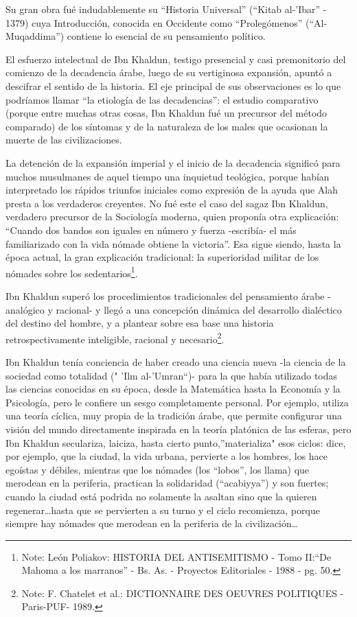 \documentclass[
]{book}
\begin{document}
Su gran obra fué indudablemente su ``Historia Universal'' (``Kitab al-'Ibar'' - 1379) cuya Introducción, conocida en Occidente como ``Prolegómenos'' (``Al-Muqaddima'') contiene lo esencial de su pensamiento político.

El esfuerzo intelectual de Ibn Khaldun, testigo presencial y casi premonitorio del comienzo de la decadencia árabe, luego de su vertiginosa expansión, apuntó a descifrar el sentido de la historia. El eje principal de sus observaciones es lo que podríamos llamar ``la etiología de las decadencias'': el estudio comparativo (porque entre muchas otras cosas, Ibn Khaldun fué un precursor del método comparado) de los síntomas y de la naturaleza de los males que ocasionan la muerte de las civilizaciones.

La detención de la expansión imperial y el inicio de la decadencia significó para muchos musulmanes de aquel tiempo una inquietud teológica, porque habían interpretado los rápidos triunfos iniciales como expresión de la ayuda que Alah presta a los verdaderos creyentes. No fué este el caso del sagaz Ibn Khaldun, verdadero precursor de la Sociología moderna, quien proponía otra explicación: ``Cuando dos bandos son iguales en número y fuerza -escribía- el más familiarizado con la vida nómade obtiene la victoria''. Esa sigue siendo, hasta la época actual, la gran explicación tradicional: la superioridad militar de los nómades sobre los sedentarios\footnote{Note: León Poliakov: HISTORIA DEL ANTISEMITISMO - Tomo II:``De Mahoma a los marranos'' - Bs. As. - Proyectos Editoriales - 1988 - pg. 50.}.

Ibn Khaldun superó los procedimientos tradicionales del pensamiento árabe -analógico y racional- y llegó a una concepción dinámica del desarrollo dialéctico del destino del hombre, y a plantear sobre esa base una historia retrospectivamente inteligible, racional y necesario\footnote{Note: F. Chatelet et al.: DICTIONNAIRE DES OEUVRES POLITIQUES - Paris-PUF- 1989.}.

Ibn Khaldun tenía conciencia de haber creado una ciencia nueva -la ciencia de la sociedad como totalidad (" 'Ilm al-'Umran``)- para la que había utilizado todas las ciencias conocidas en su época, desde la Matemática hasta la Economía y la Psicología, pero le confiere un sesgo completamente personal. Por ejemplo, utiliza una teoría cíclica, muy propia de la tradición árabe, que permite configurar una visión del mundo directamente inspirada en la teoría platónica de las esferas, pero Ibn Khaldun seculariza, laiciza, hasta cierto punto,''materializa" esos ciclos: dice, por ejemplo, que la ciudad, la vida urbana, pervierte a los hombres, los hace egoístas y débiles, mientras que los nómades (los ``lobos'', los llama) que merodean en la periferia, practican la solidaridad (``acabiyya'') y son fuertes; cuando la ciudad está podrida no solamente la asaltan sino que la quieren regenerar\ldots hasta que se pervierten a su turno y el ciclo recomienza, porque siempre hay nómades que merodean en la periferia de la civilización\ldots{}
\end{document}
